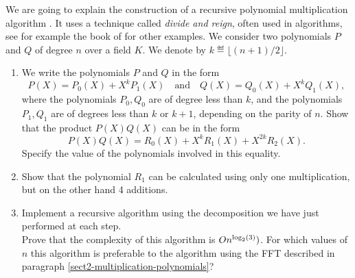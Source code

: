  
\begin{exo}
\label{exo-algo-karatsuba}
 
    We are going to explain the construction of a recursive polynomial multiplication algorithm . It uses a technique called \textit{divide and reign}, often used in algorithms, see for example the book of  for other examples. We consider two polynomials $ P $ and $ Q $ of degree $ n $ over a field $ K $. We denote by $ k \eqdef \lfloor (n + 1) / 2 \rfloor $. \begin{enumerate}
\item We write the polynomials $ P $ and $ Q $ in the form
\begin{equation*}
P (X) = P_0 (X) + X^k P_1 (X) \quad \text{and} \quad Q (X) = Q_0 (X) + X^k Q_1 (X),
\end{equation*}
where the polynomials $ P_0, Q_0 $ are of degree less than $ k $, and the polynomials $ P_1, Q_1 $ are of degrees less than $ k $ or $ k + 1 $, depending on the parity of $ n $. Show that the product $ P (X) Q (X) $ can be in the form
\begin{equation*}
P (X) Q (X) = R_0 (X) + X^k R_1 (X) + X^{2 k} R_2 (X).
\end{equation*}
Specify the value of the polynomials involved in this equality.
\item Show that the polynomial $ R_1 $ can be calculated using only one multiplication, but on the other hand 4 additions.
\item {} Implement a recursive algorithm using the decomposition we have just performed at each step. \\Prove that the complexity of this algorithm is $ \grdo (n^{\log_2 (3)}) $. For which values of $ n $ this algorithm is preferable to the algorithm using the FFT described in paragraph \ref{sect2-multiplication-polynomials}?
\end{enumerate}
\end{exo}
 
